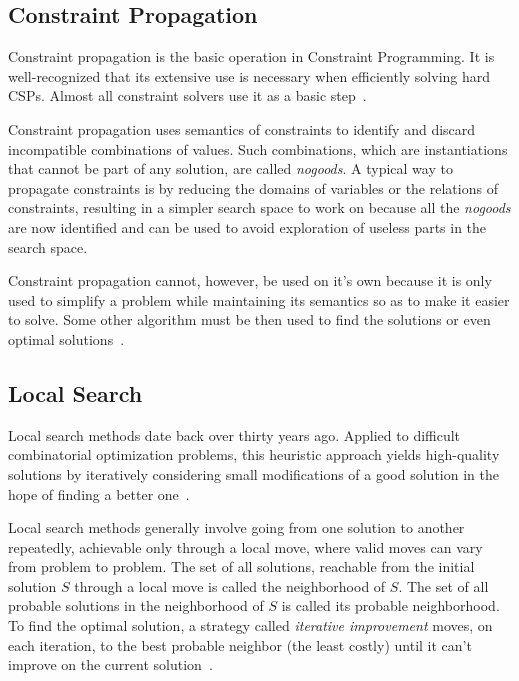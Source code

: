 \subsection{Constraint Propagation}

Constraint propagation is the basic operation in Constraint Programming. It is well-recognized that its extensive use is necessary when efficiently solving hard \acp{CSP}. Almost all constraint solvers use it as a basic step~\cite{bessiere2001refining}.

Constraint propagation uses semantics of constraints to identify and discard incompatible combinations of values. Such combinations, which are instantiations that cannot be part of any solution, are called \textit{nogoods}. A typical way to propagate constraints is by reducing the domains of variables or the relations of constraints, resulting in a simpler search space to work on because all the \textit{nogoods} are now identified and can be used to avoid exploration of useless parts in the search space. 

Constraint propagation cannot, however, be used on it's own because it is only used to simplify a problem while maintaining its semantics so as to make it easier to solve. Some other algorithm must be then used to find the solutions or even optimal solutions~\cite{Lecoutre2010}.

\subsection{Local Search}

Local search methods date back over thirty years ago. Applied to difficult combinatorial optimization problems, this heuristic approach yields high-quality solutions by iteratively considering small modifications of a good solution in the hope of finding a better one~\cite{lin1965computer}.

Local search methods generally involve going from one solution to another repeatedly, achievable only through a local move, where valid moves can vary from problem to problem. The set of all solutions, reachable from the initial solution $S$ through a local move is called the neighborhood of $S$. The set of all probable solutions in the neighborhood of $S$ is called its probable neighborhood. To find the optimal solution, a strategy called \textit{iterative improvement} moves, on each iteration, to the best probable neighbor (the least costly) until it can't improve on the current solution~\cite{jussien2002local}.

